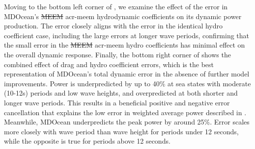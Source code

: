 \documentclass[a4paper,fleqn,colorlinks,unicode,lineno]{cas-dc} %
\makeatletter
\providecommand{\DIFdeltex}[1]{{\protect\color{red}\sout{#1}}} %
\providecommand{\DIFaddbegin}{} %
\providecommand{\DIFaddend}{} %
\providecommand{\DIFdelbegin}{} %
\providecommand{\DIFdelend}{} %
\providecommand{\DIFdel}[1]{\texorpdfstring{\DIFdeltex{#1}}{}} %
\providecommand{\DIFscaledelfig}{0.5}
\newlength{\DIFdelgraphicswidth} %
\newlength{\DIFdelgraphicsheight} %
\providecommand{\DIFaddincludegraphics}[2][]{{\color{blue}\fbox{\DIFOincludegraphics[#1]{#2}}}} %
\providecommand{\DIFdelincludegraphics}[2][]{%
\sbox{\DIFdelgraphicsbox}{\DIFOincludegraphics[#1]{#2}}%
\settoboxwidth{\DIFdelgraphicswidth}{\DIFdelgraphicsbox} %
\settoboxtotalheight{\DIFdelgraphicsheight}{\DIFdelgraphicsbox} %
\scalebox{\DIFscaledelfig}{%
\parbox[b]{\DIFdelgraphicswidth}{\usebox{\DIFdelgraphicsbox}\\[-\baselineskip] \rule{\DIFdelgraphicswidth}{0em}}\llap{\resizebox{\DIFdelgraphicswidth}{\DIFdelgraphicsheight}{%
\setlength{\unitlength}{\DIFdelgraphicswidth}%
\begin{picture}(1,1)%
\thicklines\linethickness{2pt} %
{\color[rgb]{1,0,0}\put(0,0){\framebox(1,1){}}}%
{\color[rgb]{1,0,0}\put(0,0){\line( 1,1){1}}}%
{\color[rgb]{1,0,0}\put(0,1){\line(1,-1){1}}}%
\end{picture}%
}\hspace*{3pt}}} %
} %
\DeclareRobustCommand{\DIFaddbegin}{\DIFOaddbegin \let\includegraphics\DIFaddincludegraphics} %
\DeclareRobustCommand{\DIFaddend}{\DIFOaddend \let\includegraphics\DIFOincludegraphics} %
\DeclareRobustCommand{\DIFdelbegin}{\DIFOdelbegin \let\includegraphics\DIFdelincludegraphics} %
\DeclareRobustCommand{\DIFdelend}{\DIFOaddend \let\includegraphics\DIFOincludegraphics} %
\let\sout@orig\sout %
\renewcommand{\sout}[1]{\ifmmode\text{\sout@orig{\ensuremath{#1}}}\else\sout@orig{#1}\fi} %
\makeatother
\begin{document}
Moving to the bottom left corner of , we examine the effect of the error in MDOcean's \DIFdelbegin \DIFdel{MEEM }\DIFdelend \DIFaddbegin \gls{acr-meem} \DIFaddend hydrodynamic coefficients on its dynamic power production.
The error closely aligns with the error in the identical hydro coefficient case, including the large errors at longer wave periods, confirming that the small error in the \DIFdelbegin \DIFdel{MEEM }\DIFdelend \DIFaddbegin \gls{acr-meem} \DIFaddend hydro coefficients has minimal effect on the overall dynamic response.
Finally, the bottom right corner of  shows the combined effect of drag and hydro coefficient errors, which is the best representation of MDOcean's total dynamic error in the absence of further model improvements.
Power is underpredicted by up to 40\% at sea states with moderate (10-12s) periods and low wave heights, and overpredicted at both shorter and longer wave periods.
This results in a beneficial positive and negative error cancellation that explains the low error in weighted average power described in .
Meanwhile, MDOcean underpredicts the peak power by around 25\%.
Error scales more closely with wave period than wave height for periods under 12 seconds, while the opposite is true for periods above 12 seconds.
\end{document}
